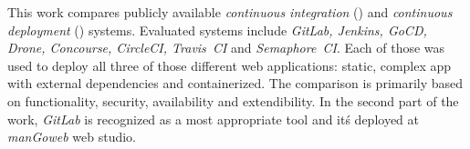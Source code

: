 This work compares publicly available \textit{continuous integration} (\CI) and \textit{continuous deployment} (\CD) systems. Evaluated systems include \textit{GitLab, Jenkins, GoCD, Drone, Concourse, CircleCI, Travis~CI} and \textit{Semaphore~CI}. Each of those was used to deploy all three of those different web applications: static, complex app with external dependencies and containerized. The comparison is primarily based on functionality, security, availability and extendibility. In the second part of the work, \textit{GitLab} is recognized as a most appropriate tool and it\'s deployed at \textit{manGoweb} web studio.

